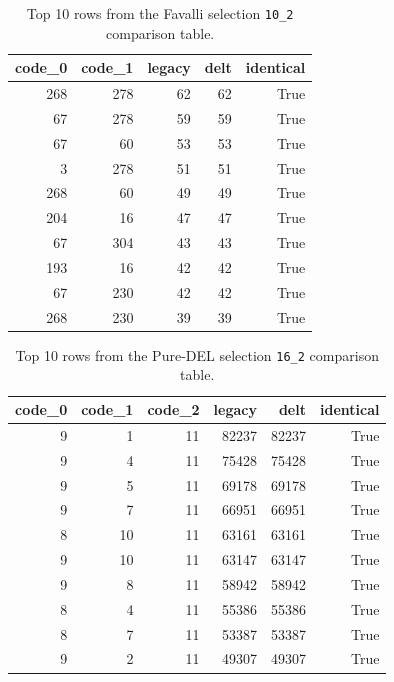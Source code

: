 \begin{table}[htbp]
\centering
\small
\caption{Top 10 rows from the Favalli selection \texttt{10\_2} comparison table.}
\label{tab:favalli-example}
\begin{tabular}{rrrrr}
\toprule
\textbf{code\_0} & \textbf{code\_1} & \textbf{legacy} & \textbf{delt} & \textbf{identical} \\
\midrule
268 & 278 & 62 & 62 & True \\
67 & 278 & 59 & 59 & True \\
67 & 60 & 53 & 53 & True \\
3 & 278 & 51 & 51 & True \\
268 & 60 & 49 & 49 & True \\
204 & 16 & 47 & 47 & True \\
67 & 304 & 43 & 43 & True \\
193 & 16 & 42 & 42 & True \\
67 & 230 & 42 & 42 & True \\
268 & 230 & 39 & 39 & True \\
\bottomrule
\end{tabular}
\end{table}

\begin{table}[htbp]
\centering
\small
\caption{Top 10 rows from the Pure-DEL selection \texttt{16\_2} comparison table.}
\label{tab:puredel-example}
\begin{tabular}{rrrrrr}
\toprule
\textbf{code\_0} & \textbf{code\_1} & \textbf{code\_2} & \textbf{legacy} & \textbf{delt} & \textbf{identical} \\
\midrule
9 & 1 & 11 & 82237 & 82237 & True \\
9 & 4 & 11 & 75428 & 75428 & True \\
9 & 5 & 11 & 69178 & 69178 & True \\
9 & 7 & 11 & 66951 & 66951 & True \\
8 & 10 & 11 & 63161 & 63161 & True \\
9 & 10 & 11 & 63147 & 63147 & True \\
9 & 8 & 11 & 58942 & 58942 & True \\
8 & 4 & 11 & 55386 & 55386 & True \\
8 & 7 & 11 & 53387 & 53387 & True \\
9 & 2 & 11 & 49307 & 49307 & True \\
\bottomrule
\end{tabular}
\end{table}


